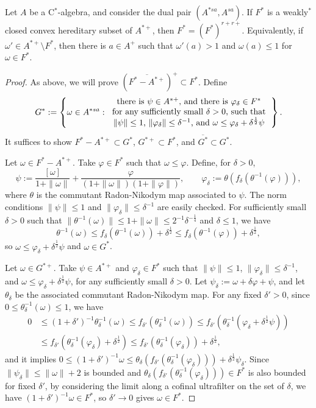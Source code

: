 \documentclass[10pt,a4paper]{amsart}
\begin{document}
\begin{theorem}
Let $A$ be a C$^*$-algebra, and consider the dual pair $(A^{*sa},A^{sa})$.
If $F^*$ is a weakly$^*$ closed convex hereditary subset of $A^{*+}$, then $F^*=(F^*)^{r+r+}$.
Equivalently, if $\omega'\in A^{*+}\setminus F^*$, then there is $a\in A^+$ such that $\omega'(a)>1$ and $\omega(a)\le1$ for $\omega\in F^*$.
\end{theorem}

\begin{proof}
As above, we will prove $(\overline{F^*-A^{*+}})^+\subset F^*$.
Define
\[G^*:=\left\{\omega\in A^{*sa}:\begin{tabular}{c}
there is $\psi\in A^{*+}$, and there is $\varphi_\delta\in F^*$ \\
for any sufficiently small $\delta>0$,
such that\\
$\|\psi\|\le1$, $\|\varphi_\delta\|\le\delta^{-1}$, and $\omega\le\varphi_\delta+\delta^{\frac12}\psi$
\end{tabular}\right\}.\]
It suffices to show $F^*-A^{*+}\subset G^*$, $G^{*+}\subset F^*$, and $\overline{G^*}\subset G^*$.

Let $\omega\in F^*-A^{*+}$.
Take $\varphi\in F^*$ such that $\omega\le\varphi$.
Define, for $\delta>0$,
\[\psi:=\frac{[\omega]}{1+\|\omega\|}+\frac\varphi{(1+\|\omega\|)(1+\|\varphi\|)},\qquad\varphi_\delta:=\theta(f_\delta(\theta^{-1}(\varphi))),\]
where $\theta$ is the commutant Radon-Nikodym map associated to $\psi$.
The norm conditions $\|\psi\|\le1$ and $\|\varphi_\delta\|\le\delta^{-1}$ are easily checked.
For sufficiently small $\delta>0$ such that $\|\theta^{-1}(\omega)\|\le1+\|\omega\|\le2^{-1}\delta^{-\frac14}$ and $\delta\le1$, we have
\[\theta^{-1}(\omega)\le f_\delta(\theta^{-1}(\omega))+\delta^{\frac12}\le f_\delta(\theta^{-1}(\varphi))+\delta^{\frac12},\]
so $\omega\le\varphi_\delta+\delta^{\frac12}\psi$ and $\omega\in G^*$.

Let $\omega\in G^{*+}$.
Take $\psi\in A^{*+}$ and $\varphi_\delta\in F^*$ such that $\|\psi\|\le1$, $\|\varphi_\delta\|\le\delta^{-1}$, and $\omega\le\varphi_\delta+\delta^{\frac12}\psi$, for any sufficiently small $\delta>0$.
Let $\psi_\delta:=\omega+\delta\varphi+\psi$, and let $\theta_\delta$ be the associated commutant Radon-Nikodym map.
For any fixed $\delta'>0$, since $0\le\theta_\delta^{-1}(\omega)\le1$, we have
\begin{align*}
0&\le(1+\delta')^{-1}\theta_\delta^{-1}(\omega)\le f_{\delta'}(\theta_\delta^{-1}(\omega))\le f_{\delta'}(\theta_\delta^{-1}(\varphi_\delta+\delta^{\frac12}\psi))\\
&\le f_{\delta'}(\theta_\delta^{-1}(\varphi_\delta)+\delta^{\frac12})\le f_{\delta'}(\theta_\delta^{-1}(\varphi_\delta))+\delta^{\frac12},
\end{align*}
and it implies $0\le(1+\delta')^{-1}\omega\le\theta_\delta(f_{\delta'}(\theta_\delta^{-1}(\varphi_\delta)))+\delta^{\frac12}\psi_\delta$.
Since $\|\psi_\delta\|\le\|\omega\|+2$ is bounded and $\theta_\delta(f_{\delta'}(\theta_\delta^{-1}(\varphi_\delta)))\in F^*$ is also bounded for fixed $\delta'$, by considering the limit along a cofinal ultrafilter on the set of $\delta$, we have $(1+\delta')^{-1}\omega\in F^*$, so $\delta'\to0$ gives $\omega\in F^*$.


\end{proof}
\end{document}
